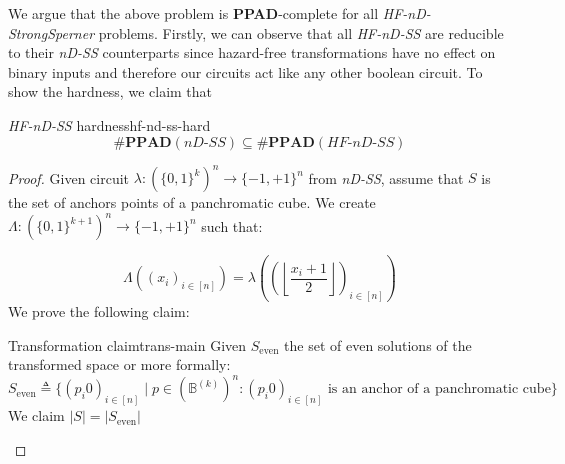 We argue that the above problem is \textbf{PPAD}-complete for all \textit{HF-nD-StrongSperner} problems. Firstly, we
can observe that all \textit{HF-nD-SS} are reducible to their \textit{nD-SS} counterparts since
hazard-free transformations have no effect on binary inputs and therefore our circuits act like any other boolean circuit.
To show the hardness, we claim that

\begin{theorembox}{\textit{HF-nD-SS} hardness}{hf-nd-ss-hard}
    $$
        \textbf{\#PPAD}(\textit{nD-SS}) \subseteq \textbf{\#PPAD}(\textit{HF-nD-SS})
    $$
\end{theorembox}

\begin{proof}
    Given circuit $\lambda: (\{0,1\}^k)^n \to \{-1,+1\}^n$ from \textit{nD-SS},
    assume that $S$ is the set of anchors points of a panchromatic cube. We create
    $\Lambda: (\{0,1\}^{k+1})^n \to \{-1,+1\}^n$ such that:

    \begin{equation}
        \Lambda((x_{i})_{i \in [n]}) = \lambda\left( \left( { \left\lfloor \frac{x_{i}+1}{2}  \right\rfloor } \right)_{i \in [n]} \right) \label{eq:chap-3:trans-double}
    \end{equation}
    We prove the following claim:

    \begin{claimbox}{Transformation claim}{trans-main}
        \label{clm:main-proof:trans-claim}
        Given $S_{\text{even}}$ the set of even solutions of the transformed space or more formally:
        $$
            S_{\text{even}} \triangleq
            \Big\{(p_i 0)_{i \in [n]}  \mid  p \in (\mathbb{B}^{(k)})^n:  (p_i 0)_{i \in [n]} \text{ is an anchor of a panchromatic cube} \Big\}
        $$
        We claim $|S| = |S_{\text{even}}|$
    \end{claimbox}


\end{proof}
